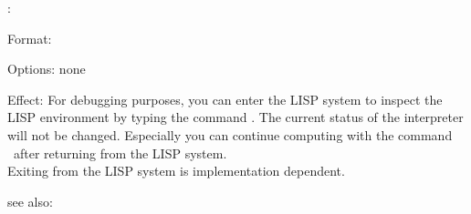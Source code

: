 \Break:

Format: 

Options: none

Effect: For debugging purposes, you can enter the LISP system to
	inspect the LISP environment by typing the command \Break. The
	current status of the interpreter will not be changed.
	Especially you can continue \RELFUN{} computing with the command \more\
	after returning from the LISP system.\\
	Exiting from the LISP system is implementation dependent.

see also: \emul 
